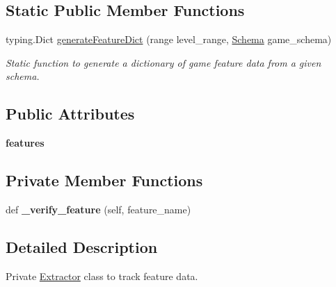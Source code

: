\subsection*{Static Public Member Functions}
\begin{DoxyCompactItemize}
\item 
typing.\+Dict \mbox{\hyperlink{classfeature__extractors_1_1_extractor_1_1_extractor_1_1_session_features_a3f528a465e33496604fe188f7a45b40d}{generate\+Feature\+Dict}} (range level\+\_\+range, \mbox{\hyperlink{classschemas_1_1_schema_1_1_schema}{Schema}} game\+\_\+schema)
\begin{DoxyCompactList}\small\item\em Static function to generate a dictionary of game feature data from a given schema. \end{DoxyCompactList}\end{DoxyCompactItemize}
\subsection*{Public Attributes}
\begin{DoxyCompactItemize}
\item 
\mbox{\label{classfeature__extractors_1_1_extractor_1_1_extractor_1_1_session_features_ac4873f8095469c9063bc3f8c4b6b8042}} 
{\bfseries features}
\end{DoxyCompactItemize}
\subsection*{Private Member Functions}
\begin{DoxyCompactItemize}
\item 
\mbox{\label{classfeature__extractors_1_1_extractor_1_1_extractor_1_1_session_features_a033985eedb7009c0b22688ba44cdf228}} 
def {\bfseries \+\_\+verify\+\_\+feature} (self, feature\+\_\+name)
\end{DoxyCompactItemize}


\subsection{Detailed Description}
Private \mbox{\hyperlink{classfeature__extractors_1_1_extractor_1_1_extractor}{Extractor}} class to track feature data. 

